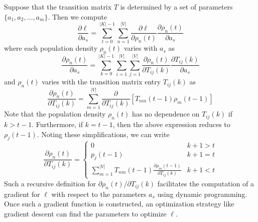 \documentclass[11pt,letterpaper]{article}
\theoremstyle{definition}
\begin{document}
	Suppose that the transition matrix $T$ is determined by a set of parameters $\{a_1, a_2, \dots, a_m\}$. Then we compute
	\[
		\frac{\partial \ell}{\partial a_s} = \sum^{|K| - 1}_{t = 0} \sum^{|V|}_{n = 1} \frac{\partial \ell}{\partial \rho_n(t)} \frac{\partial \rho_n(t)}{\partial a_s}
	\]
	where each population density $\rho_n(t)$ varies with $a_s$ as
	\[
		\frac{\partial \rho_n(t)}{\partial a_s} = 
		\sum^{|K| - 1}_{k = 0} \sum^{|V|}_{i = 1} \sum^{|V|}_{j = 1} \frac{\partial \rho_n(t)}{\partial T_{ij}(k)}\frac{\partial T_{ij}(k)}{\partial a_s}
	\]
	and $\rho_n(t)$ varies with the transition matrix entry $T_{ij}(k)$ as
	\[
		\frac{\partial \rho_n(t)}{\partial T_{ij}(k)} = 
		\sum^{|V|}_{m = 1} \frac{\partial}{\partial T_{ij}(k)} \left[ T_{nm}(t - 1) \rho_m(t - 1) \right]
	\]
	Note that the population density $\rho_n(t)$ has no dependence on $T_{ij}(k)$ if $k > t - 1$. Furthermore, if $k = t - 1$, then the above expression reduces to $\rho_j(t - 1)$. Noting these simplifications, we can write
	\[
		\frac{\partial \rho_n(t)}{\partial T_{ij}(k)} = \left\{
		\begin{array}{ll}
		0 & k + 1 > t \\
		p_j(t - 1) & k + 1 = t \\
		\sum^{|V|}_{m = 1} T_{nm}(t - 1) \frac{\partial \rho_m(t - 1)}{\partial T_{ij}(k)} & k + 1 < t
		\end{array}
		\right.
	\]
	Such a recursive definition for $\partial \rho_n(t) / \partial T_{ij}(k)$ facilitates the computation of a gradient for $\ell$ with respect to the parameters $a_s$ using dynamic programming. Once such a gradient function is constructed, an optimization strategy like gradient descent can find the parameters to optimize $\ell$.
	
\end{document}
